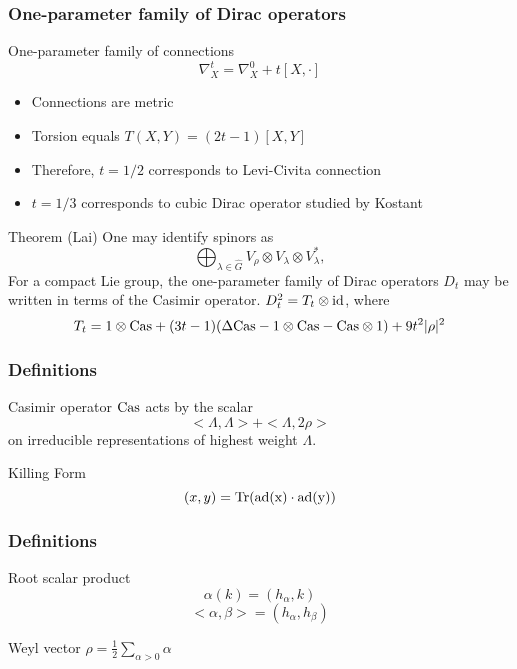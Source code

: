 \documentclass{beamer}
\def\Cas{{\rm Cas}}
\def\id{{\rm id}}
\def\Tr{{\rm Tr}}
\begin{document}
\begin{frame}
  \frametitle{One-parameter family of Dirac operators}
  \begin{block}{One-parameter family of connections}
    \[
      \nabla_X^t = \nabla_X^0 + t[X, \cdot]
    \]
  \end{block}

  \pause

  \begin{block}{}
    \begin{itemize}
      \item Connections are metric
      \item Torsion equals $T(X,Y) = (2t-1)[X,Y]$
      \item Therefore, $t = 1/2$ corresponds to Levi-Civita connection
      \item $t = 1/3$ corresponds to cubic Dirac operator studied by Kostant
    \end{itemize}
  \end{block}
\end{frame}

\begin{frame}
  \begin{block}{Theorem (Lai)}
    One may identify spinors as
	\[
\bigoplus _{\lambda \in \widehat{G}} V_{\rho}\otimes V_\lambda \otimes V_\lambda ^* ,
	\]
    For a compact Lie group, the one-parameter family of Dirac operators $D_t$ may be written in terms of the Casimir operator. $D_t^2 = T_t \otimes \id$, where 
    \[
      T_t = 1 \otimes \Cas + (3t-1)(\Delta \Cas - 1 \otimes \Cas - \Cas \otimes 1) + 9 t^2 |\rho|^2
    \]
  \end{block}
\end{frame}

\begin{frame}
	\frametitle{Definitions}
  \begin{block}{Casimir operator}
    $\Cas$ acts by the scalar 
    \[
    <\Lambda, \Lambda> + <\Lambda, 2 \rho>
    \]
    on irreducible representations of highest weight $\Lambda$.
  \end{block}
	\begin{block}{Killing Form}
	\[
	(x,y) = \Tr(\rm{ad}(x) \cdot \rm{ad}(y))
	\]
	\end{block}
\end{frame}

\begin{frame}
	\frametitle{Definitions}
	\begin{block}{Root scalar product}
	\[
	\alpha(k) = (h_{\alpha}, k)
	\]
	\[
	<\alpha, \beta> = (h_{\alpha}, h_{\beta})
	\]
	\end{block}
	\begin{block}{Weyl vector $\rho = \frac{1}{2} \sum_{\alpha > 0} \alpha$}
	\end{block}
\end{frame}
\end{document}
